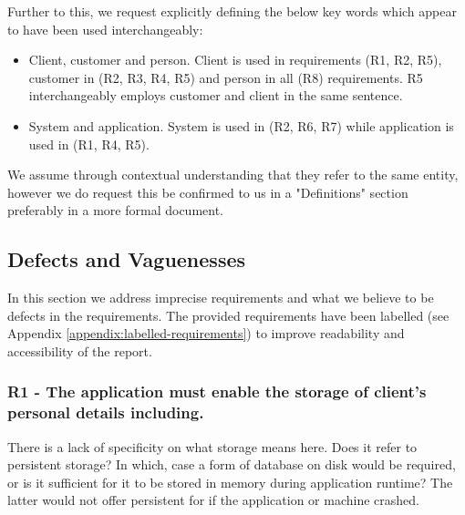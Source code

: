 Further to this, we request explicitly defining the below key words which  appear to have been used interchangeably:  

\begin{itemize} 
	\item Client, customer and person. Client is used in requirements (R1, R2, R5), customer in (R2, R3, R4, R5) and person in all (R8) requirements.  R5 interchangeably employs customer and client in the same sentence. 
	\item System and application. System is used in (R2, R6, R7) while application is used in (R1, R4, R5).
\end{itemize}

We assume through contextual understanding that they refer to the same entity, however we do request this be confirmed to us in a "Definitions" section preferably in a more formal document.

\par


\subsection{Defects and Vaguenesses}

In this section we address imprecise requirements and what we believe to be defects in the requirements. The provided requirements have been labelled (see Appendix \ref{appendix:labelled-requirements}) to improve readability and accessibility of the report. 

\subsubsection{R1 - The application must enable the storage of client’s personal details including. }

There is a lack of specificity on what storage means here. Does it refer to persistent storage? In which, case a form of database on disk would be required, or is it sufficient for it to be stored in memory during application runtime? The latter would not offer persistent for if the application or machine crashed.  

